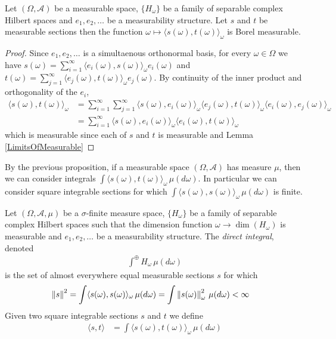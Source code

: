 \begin{prop}\label{hilbert:InnerProductOfMeasurableSections}Let $(\Omega, \mathcal{A})$ be a measurable space, $\lbrace H_\omega \rbrace$ be a family of separable complex Hilbert spaces and $e_1, e_2,\dotsc$ be a measurability structure.  Let $s$ and $t$ be measurable sections then the function $\omega \mapsto \langle s(\omega), t(\omega) \rangle_\omega$ is Borel measurable.
\end{prop}
\begin{proof}
Since $e_1, e_2, \dotsc$ is a simultaenous orthonormal basis, for every $\omega \in \Omega$  we have $s(\omega) = \sum_{i=1}^\infty \langle e_i(\omega), s(\omega) \rangle_\omega e_i(\omega)$ and $t(\omega) = \sum_{j=1}^\infty \langle e_j(\omega), t(\omega) \rangle_\omega e_j(\omega)$.  By continuity of the inner product and orthogonality of the $e_i$,
\begin{align*}
\langle s(\omega), t(\omega) \rangle_\omega 
&= \sum_{i=1}^\infty \sum_{j=1}^\infty \langle  s(\omega)  , e_i(\omega)\rangle_\omega \langle e_j(\omega), t(\omega) \rangle_\omega \langle e_i(\omega), e_j(\omega) \rangle_\omega \\
&=\sum_{i=1}^\infty  \langle s(\omega)  ,e_i(\omega)\rangle_\omega \langle e_i(\omega), t(\omega) \rangle_\omega 
\end{align*}
which is measurable since each of $s$ and $t$ is measurable and Lemma \ref{LimitsOfMeasurable}
\end{proof}

By the previous proposition, if a measurable space $(\Omega, \mathcal{A})$ has measure $\mu$, then we can consider integrals $\int \langle s(\omega), t(\omega) \rangle_\omega \, \mu(d\omega)$.  In particular we can consider square integrable sections for which $\int \langle s(\omega), s(\omega) \rangle_\omega \, \mu(d\omega)$ is finite.

\begin{defn}Let $(\Omega, \mathcal{A}, \mu)$ be a $\sigma$-finite measure space, $\lbrace H_\omega \rbrace$ be a family of separable complex Hilbert spaces such that the dimension function $\omega \to \dim(H_\omega)$ is measurable and $e_1, e_2,\dotsc$ be a measurability structure. The \emph{direct integral}, denoted
\begin{align*}
\int^\oplus H_\omega \, \mu(d\omega)
\end{align*}
is the set of almost everywhere equal measurable sections $s$ for which
\begin{align*}
\left \lVert s \right \rVert^2 &= \int \langle s(\omega), s(\omega) \rangle_\omega \, \mu(d\omega) = \int \left \lVert  s(\omega) \right \rVert^2_\omega \, \mu(d\omega) < \infty
\end{align*}
Given two square integrable sections $s$ and $t$ we define 
\begin{align*}
\langle s, t \rangle &= \int \langle s(\omega), t(\omega) \rangle_\omega \, \mu(d\omega)
\end{align*}
\end{defn}

